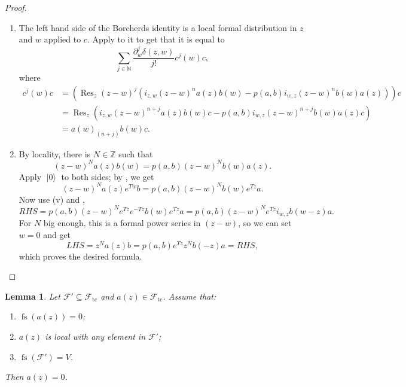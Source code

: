 \documentclass[a4paper, 12pt, reqno]{amsart}
\newtheorem{lemma}[theorem]{Lemma}
\theoremstyle{remark}
\numberwithin{equation}{subsection}
\DeclareMathOperator{\Res}{Res}
\DeclareMathOperator{\vac}{|0\rangle}
\DeclareMathOperator{\fs}{fs}
\DeclareMathOperator{\tc}{tc}
\begin{document}
\begin{proof}
\begin{enumerate}
  \item The left hand side of the Borcherds identity is a local formal distribution in $z$ and $w$ applied to $c$.
    Apply  to it to get that it is equal to
    \begin{equation*}
      \sum_{j \in \mathbb{N}} \frac{\partial^j_w\delta(z,w)}{j!}c^j(w)c,
    \end{equation*}
    where
    \begin{align*}
      c^j(w)c &= (\Res_z(z - w)^j(i_{z, w}(z - w)^na(z)b(w) - p(a, b)i_{w, z}(z - w)^nb(w)a(z)))c \\
      &= \Res_z(i_{z, w}(z - w)^{n + j}a(z)b(w)c - p(a, b)i_{w, z}(z - w)^{n + j}b(w)a(z)c) \\
      &= a(w)_{(n + j)}b(w)c.
    \end{align*}
  \item By locality, there is $N \in \mathbb{Z}$ such that
    \begin{equation*}
      (z - w)^Na(z)b(w) = p(a, b)(z - w)^Nb(w)a(z).
    \end{equation*}
    Apply $\vac$ to both sides; by , we get
    \begin{equation*}
      (z - w)^Na(z)e^{Tw}b = p(a, b)(z - w)^Nb(w)e^{Tz}a.
    \end{equation*}
    Now use (v) and ,
    \begin{equation*}
      RHS = p(a, b)(z - w)^Ne^{Tz}e^{-Tz}b(w)e^{Tz}a = p(a, b)(z - w)^Ne^{Tz}i_{w, z}b(w - z)a.
    \end{equation*}
    For $N$ big enough, this is a formal power series in $(z - w)$, so we can set $w = 0$ and get
    \begin{equation*}
      LHS = z^Na(z)b = p(a, b)e^{Tz}z^Nb(-z)a = RHS,
    \end{equation*}
    which proves the desired formula. \qedhere
  \end{enumerate}
\end{proof}

\begin{lemma}
  \label{lmm:7}
  Let $\mathcal{F}' \subseteq \mathcal{F}_{\tc}$ and $a(z) \in \mathcal{F}_{\tc}$.
  Assume that:
  \begin{enumerate}
  \item $\fs(a(z)) = 0$;
  \item $a(z)$ is local with any element in $\mathcal{F}'$;
  \item $\fs(\mathcal{F}') = V$.
  \end{enumerate}
  Then $a(z) = 0$.
\end{lemma}
\end{document}
